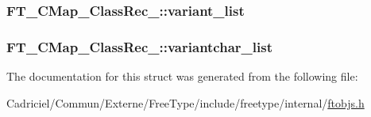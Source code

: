 \hypertarget{struct_f_t___c_map___class_rec___ad61635444cbfc71c4259e74cb892c172}{
\subsubsection[{variant\-\_\-list}]{ F\-T\-\_\-\-C\-Map\-\_\-\-Class\-Rec\-\_\-\-::variant\-\_\-list}}\label{struct_f_t___c_map___class_rec___ad61635444cbfc71c4259e74cb892c172}
\hypertarget{struct_f_t___c_map___class_rec___ac1563590a0bac99082aa0996b94aad57}{
\subsubsection[{variantchar\-\_\-list}]{ F\-T\-\_\-\-C\-Map\-\_\-\-Class\-Rec\-\_\-\-::variantchar\-\_\-list}}\label{struct_f_t___c_map___class_rec___ac1563590a0bac99082aa0996b94aad57}


The documentation for this struct was generated from the following file\-:\begin{DoxyCompactItemize}
\item 
Cadriciel/\-Commun/\-Externe/\-Free\-Type/include/freetype/internal/\hyperlink{ftobjs_8h}{ftobjs.\-h}\end{DoxyCompactItemize}
